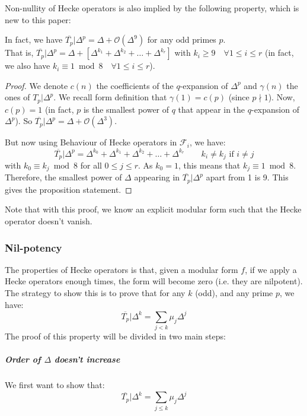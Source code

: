 Non-nullity of Hecke operators is also implied by the following property, which is new to this paper:
\begin{property}
	In fact, we have $\overline{T_p}|\Delta^p = \Delta + \mathcal{O}(\Delta^9)$ for any odd primes $p$.\\
	That is, $\overline{T_p}|\Delta^p = \Delta + \left[ \Delta^{k_1} + \Delta^{k_2} + \dots + \Delta^{k_r} \right] $ with $k_i \geq 9 \quad \forall 1 \leq i \leq r$ (in fact, we also have $k_i \equiv 1 \bmod 8 \quad \forall 1 \leq i \leq r$).
\end{property}
\begin{proof}
	We denote $c(n)$ the coefficients of the $q$-expansion of $\Delta^p$ and $\gamma(n)$ the ones of $T_p|\Delta^p$.
	We recall form definition that $\gamma(1)=c(p)$ (since $p \nmid 1$).
	Now, $c(p)=1$ (in fact, $p$ is the smallest power of $q$ that appear in the $q$-expansion of $\Delta^p$).
	So $\overline{T_p}|\Delta^p = \Delta + \mathcal{O}(\Delta^3)$.
	
	But now using Behaviour of Hecke operators in $\mathcal{F}_i$, we have:
	$$
	\overline{T_p}|\Delta^p = \Delta^{k_0} + \Delta^{k_1} + \Delta^{k_2} + \dots + \Delta^{k_r} \qquad k_i \neq k_j \text{ if } i \neq j
	$$
	with $k_0 \equiv k_j \bmod 8$ for all $0 \leq j \leq r$.
	As $k_0=1$, this means that $k_j \equiv 1 \bmod 8$.
	Therefore, the smallest power of $\Delta$ appearing in $\overline{T_p}|\Delta^p$ apart from 1 is 9.
	This gives the proposition statement.
\end{proof}
Note that with this proof, we know an explicit modular form such that the Hecke operator doesn't vanish.



\subsubsection{Nil-potency}
\label{NilpotencyHeckeOperators}
The properties of Hecke operators is that, given a modular form $f$, if we apply a Hecke operators enough times, the form will become zero (i.e. they are nilpotent).
The strategy to show this is to prove that for any $k$ (odd), and any prime $p$, we have:
$$
\overline{T_p}| \Delta^k = \sum_{j < k} \mu_j \Delta^j
$$
The proof of this property will be divided in two main steps:

\subparagraph{Order of $\Delta$ doesn't increase}
We first want to show that:
$$
\overline{T_p}| \Delta^k = \sum_{j \leq k} \mu_j \Delta^j
$$

